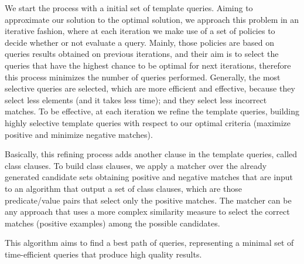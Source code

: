 \begin{itemize}
We start the process with a initial set of template queries. Aiming to approximate our solution to the optimal solution, we approach this problem in an iterative fashion, where at each iteration we make use of a set of policies to decide whether or not evaluate a query. Mainly, those policies are based on queries results obtained on previous iterations, and their aim is to select the queries that have the highest chance to be optimal for next iterations, therefore this process minimizes the number of queries performed. Generally, the most selective queries are selected, which are more efficient and effective, because they select less elements (and it takes less time); and they select less incorrect matches. To be effective, at each iteration we refine the template queries, building highly selective template queries with respect to our optimal criteria (maximize positive and minimize negative matches). 

Basically, this refining process adds another clause in the template queries, called class clauses. To build class clauses, we apply a matcher over the already generated candidate sets obtaining positive and negative matches that are input to an algorithm that output a set of class clauses, which are those predicate/value pairs that select only the positive matches.  The matcher can be any approach that uses a more complex similarity measure to select the correct matches (positive examples) among the possible candidates. 

This algorithm aims to find a best path of queries, representing a minimal set of time-efficient queries that produce high quality results.


\end{itemize} 
 

